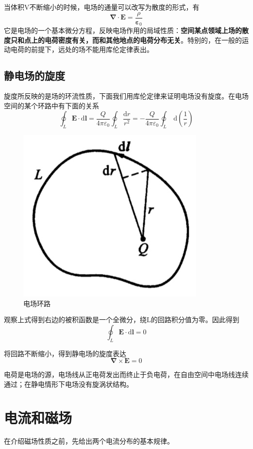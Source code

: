 		当体积V不断缩小的时候，电场的通量可以改写为散度的形式，有
		\begin{equation}
			\boxed{\boldsymbol{\nabla} \cdot \boldsymbol{E}=\frac{\rho}{\boldsymbol{\varepsilon}_{0}}}
		\end{equation}
		它是电场的一个基本微分方程，反映电场作用的局域性质：\textbf{空间某点领域上场的散度只和点上的电荷密度有关，而和其他地点的电荷分布无关}。特别的，在一般的运动电荷的前提下，远处的场不能用库伦定律表出。
	\subsection{静电场的旋度}
		旋度所反映的是场的环流性质，下面我们用库伦定律来证明电场没有旋度。在电场空间的某个环路中有下面的关系
		\begin{equation}
			\oint_{L} \boldsymbol{E} \cdot \mathrm{d} \boldsymbol{l}=\frac{Q}{4 \pi \varepsilon_{0}} \oint_{L} \frac{\mathrm{d} r}{r^{2}}=-\frac{Q}{4 \pi \varepsilon_{0}} \oint_{L} \mathrm{~d}\left(\frac{1}{r}\right)
		\end{equation}
		\begin{figure}[H]
						\centering  %
						\includegraphics[width=0.2\linewidth]{figs/电场环路.jpg}
						\caption{电场环路} %
						\label{fig.电场环路}
						\end{figure}

		观察上式得到右边的被积函数是一个全微分，绕L的回路积分值为零。因此得到
			\begin{equation}
				\boxed{\oint_{L} \boldsymbol{E} \cdot \mathrm{d} \boldsymbol{l}=0}
			\end{equation}

		将回路不断缩小，得到静电场的旋度表达
			\begin{equation}
				\boldsymbol{\nabla} \times \boldsymbol{E}=0
			\end{equation}

		电荷是电场的源，电场线从正电荷发出而终止于负电荷，在自由空间中电场线连续通过；在静电情形下电场没有旋涡状结构。
\section{电流和磁场}
		在介绍磁场性质之前，先给出两个电流分布的基本规律。
